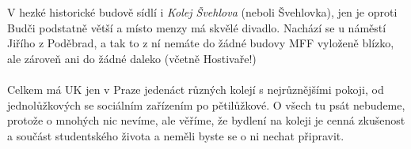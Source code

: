 V hezké historické budově sídlí i \textit{Kolej Švehlova} (neboli Švehlovka),
jen je oproti Budči podstatně větší a místo menzy má skvělé divadlo. Nachází se
u náměstí Jiřího z Poděbrad, a tak to z ní nemáte do žádné budovy MFF vyloženě
blízko, ale zároveň ani do žádné daleko (včetně Hostivaře!)
\\\\
Celkem má UK jen v Praze jedenáct různých kolejí s nejrůznějšími pokoji, od
jednolůžkových se sociálním zařízením po pětilůžkové. O všech tu psát nebudeme,
protože o mnohých nic nevíme, ale věříme, že bydlení na koleji je cenná
zkušenost a součást studentského života a neměli byste se o ni nechat připravit.